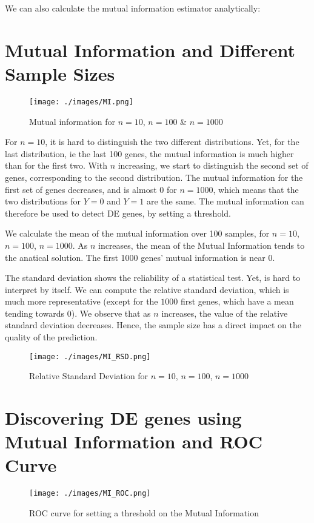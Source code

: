 \documentclass{article}
\begin{document}
We can also calculate the mutual information estimator analytically:


\section{Mutual Information and Different Sample Sizes}

\begin{figure}
\begin{center}
\texttt{[image: ./images/MI.png]}
\end{center}
\caption{Mutual information for $n=10$, $n=100$ \& $n=1000$}
\end{figure}

For $n = 10$, it is hard to distinguish the two different distributions. Yet,
for the last distribution, ie the last 100 genes, the mutual information is
much higher than for the first two. With $n$ increasing, we start to
distinguish the second set of genes, corresponding to the second distribution.
The mutual information for the first set of genes decreases, and is almost 0
for $n = 1000$, which means that the two distributions for $Y = 0$ and $Y = 1$
are the same.
The mutual information can therefore be used to detect DE genes, by setting a
threshold.

We calculate the mean of the mutual information over 100 samples, for $n=10$,
$n=100$, $n=1000$. As $n$ increases, the mean of the Mutual Information tends
to the anatical solution. The first 1000 genes' mutual information is near
$0$.

The standard deviation shows the reliability of a statistical test. Yet, is
hard to interpret by itself. We can compute the relative standard deviation,
which is much more representative (except for the $1000$ first genes, which
have a mean tending towards $0$).
We observe that as $n$ increases, the value of the relative standard deviation
decreases. Hence, the sample size has a direct impact on the quality of the
prediction.

\begin{figure}
\begin{center}
\texttt{[image: ./images/MI\_RSD.png]}
\end{center}
\caption{Relative Standard Deviation for $n=10$, $n=100$, $n=1000$}
\end{figure}

\section{Discovering DE genes using Mutual Information and ROC Curve}
\begin{figure}
\begin{center}
\texttt{[image: ./images/MI\_ROC.png]}
\end{center}
\caption{ROC curve for setting a threshold on the Mutual Information}
\end{figure}
\end{document}
